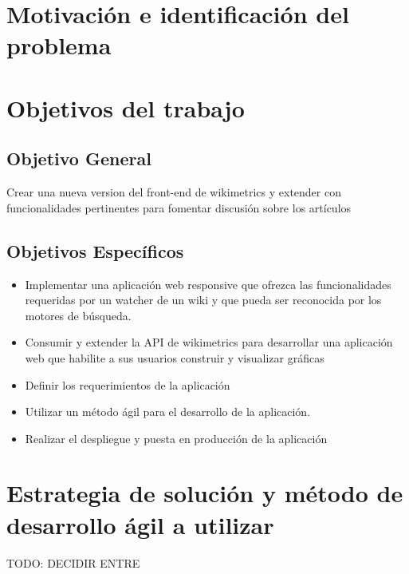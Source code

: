 

\section{Motivación e identificación del problema}

\section{Objetivos del trabajo}

\subsection{Objetivo General}

Crear una nueva version del front-end de wikimetrics y extender con funcionalidades pertinentes para fomentar discusión sobre los artículos

\subsection{Objetivos Específicos}


\begin{itemize}{}{}

    \item Implementar una aplicación web responsive que ofrezca las funcionalidades requeridas por un watcher de un wiki y que pueda ser reconocida por los motores de búsqueda.
    \item Consumir y extender la API de wikimetrics para desarrollar una aplicación web que habilite a sus usuarios construir y visualizar gráficas
    \item Definir los requerimientos de la aplicación
    \item Utilizar un método ágil para el desarrollo de la aplicación.
    \item Realizar el despliegue y puesta en producción de la aplicación

\end{itemize}

\section{Estrategia de solución y método de desarrollo ágil a utilizar}
    TODO: DECIDIR ENTRE

